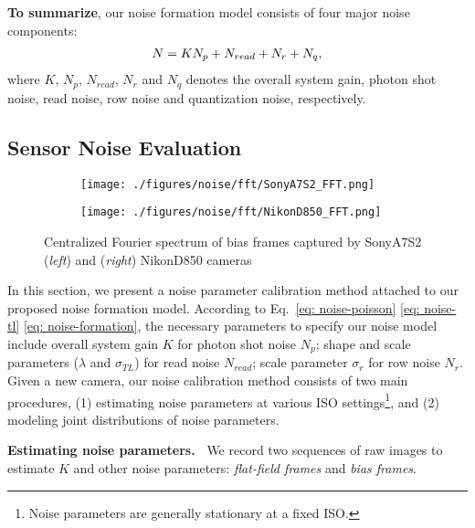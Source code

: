 \documentclass[10pt,twocolumn,letterpaper]{article}
\begin{document}
\textbf{To summarize}, our noise formation model consists of four major noise components:
\vspace{-1mm}
\begin{align}
N = K N_p + N_{read} + N_r + N_q,
\label{eq: noise-formation}
\vspace{-1mm}
\end{align}
where $K$, $N_p$, $N_{read}$, $N_r$ and $N_q$ denotes the overall system gain, photon shot noise, read noise, row noise and quantization noise, respectively. 

\subsection{Sensor Noise Evaluation} \label{sec:noise-param}

\begin{figure}[!t]
\centering
\begin{subfigure}[b]{.35\linewidth}
\centering
\texttt{[image: ./figures/noise/fft/SonyA7S2\_FFT.png]}
\end{subfigure}
\begin{subfigure}[b]{.35\linewidth}
\centering
\texttt{[image: ./figures/noise/fft/NikonD850\_FFT.png]}
\end{subfigure}
\vspace{-1mm}
\caption{Centralized Fourier spectrum of bias frames captured by SonyA7S2 (\textit{left}) and (\textit{right}) NikonD850 cameras}
\vspace{-3mm}
\label{fig:fft_bf}
\end{figure}

In this section, we present a noise parameter calibration method attached to our proposed noise formation model. According to Eq.~\eqref{eq: noise-poisson} \eqref{eq: noise-tl} \eqref{eq: noise-formation}, the necessary parameters to specify our noise model include
overall system gain $K$ for photon shot noise $N_p$; shape and scale parameters
($\lambda$ and $\sigma_{TL}$) for read noise $N_{read}$;  scale parameter $\sigma_r$ for row noise $N_r$. 
Given a new camera,  our noise calibration method consists of two main procedures, \ie (1) estimating noise parameters at various ISO settings\footnote{Noise parameters are generally stationary at a fixed ISO.}, and (2)  modeling joint distributions of noise parameters. 



\vspace{3pt}
\noindent\textbf{Estimating noise parameters.~}
We record two sequences of raw images to estimate $K$ and other noise parameters: \emph{flat-field
frames} and \emph{bias frames}.
\end{document}
